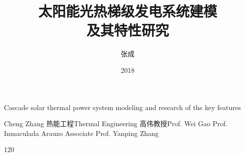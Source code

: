 \makenomenclature

\title{太阳能光热梯级发电系统建模\\及其特性研究}{Cascade solar thermal power system modeling and research of the key features}
\author
{张成}{Cheng Zhang}
\major
{热能工程}{Thermal Engineering}
\supervisor
{高伟\hspace{0.2em}教授}{Prof. Wei Gao \newline Prof. Inmaculada Arauzo \newline Associate Prof. Yanping Zhang}
\date{2018}{1}{20}